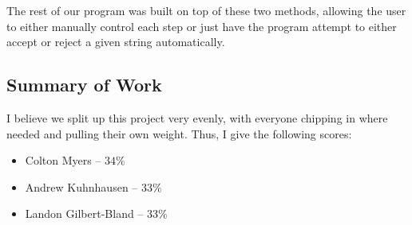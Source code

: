 \documentclass[a4paper]{article}
\begin{document}
The rest of our program was built on top of these two methods, allowing the
user to either manually control each step or just have the program attempt to
either accept or reject a given string automatically.

\subsection{Summary of Work}

I believe we split up this project very evenly, with everyone chipping in where
needed and pulling their own weight.  Thus, I give the following scores:

\begin{itemize}
\item Colton Myers -- $34\%$
\item Andrew Kuhnhausen -- $33\%$
\item Landon Gilbert-Bland -- $33\%$
\end{itemize}
\end{document}
